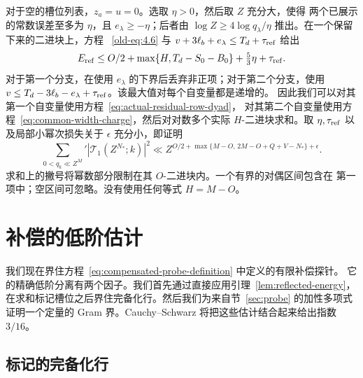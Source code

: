 对于空的槽位列表，\(z_a=u=0\)。选取 \(\eta>0\)，然后取 \(Z\) 充分大，使得
两个已展示的常数误差至多为 \(\eta\)，且 \(e_\lambda\ge-\eta\)；后者由
\(\log Z\ge4\log q_\lambda/\eta\) 推出。在一个保留下来的二进块上，方程
~\eqref{old-eq:4.6} 与 \(v+3\ell_b+e_\lambda\le T_d+\tau_{\rm ref}\) 给出
\[
 E_{\rm ref}
 \le O/2+\max\{H,T_d-S_0-B_0\}+\tfrac53\eta+\tau_{\rm ref}.
\]
对于第一个分支，在使用 \(e_\lambda\) 的下界后丢弃非正项；对于第二个分支，使用
\(v\le T_d-3\ell_b-e_\lambda+\tau_{\rm ref}\)。该最大值对每个自变量都是递增的。
因此我们可以对其第一个自变量使用方程~\eqref{eq:actual-residual-row-dyad}，
对其第二个自变量使用方程~\eqref{eq:common-width-charge}，然后对对数多个实际
\(H\)-二进块求和。取 \(\eta,\tau_{\rm ref}\) 以及局部小幂次损失关于
\(\epsilon\) 充分小，即证明
\begin{equation}\label{eq:completed-moment}
 \sum_{0<q_k\ll Z^M}'|\mathcal T_1(Z^{N_*};k)|^2
 \ll Z^{O/2+\max\{M-O,\,2M-O+Q+V-N_*\}+\epsilon}.
\end{equation}
求和上的撇号将幂数部分限制在其 \(O\)-二进块内。一个有界的对偶区间包含在
第一项中；空区间可忽略。没有使用任何等式 \(H=M-O\)。

\section{补偿的低阶估计}\label{sec:compensated-low}

我们现在界住方程~\eqref{eq:compensated-probe-definition} 中定义的有限补偿探针。
它的精确低阶分离有两个因子。我们首先通过直接应用引理~\ref{lem:reflected-energy}，
在求和标记槽位之后界住完备化行。然后我们为来自节~\ref{sec:probe} 的加性多项式
证明一个定量的 Gram 界。Cauchy--Schwarz 将把这些估计结合起来给出指数 $3/16$。

\subsection{标记的完备化行}

